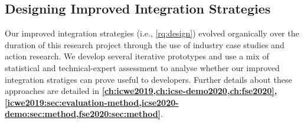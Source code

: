 
\subsection{Designing Improved Integration Strategies}

Our improved integration strategies (i.e., \ref{rq:design}) evolved organically over the duration of this research project through the use of industry case studies and action research. We develop several iterative prototypes and use a mix of statistical and technical-expert assessment to analyse whether our improved integration stratiges can prove useful to developers. Further details about these approaches are detailed in \textbf{\cref{ch:icwe2019,ch:icse-demo2020,ch:fse2020}, \cref{icwe2019:sec:evaluation-method,icse2020-demo:sec:method,fse2020:sec:method}}. 

\oldcontent

